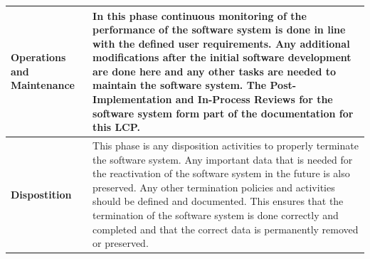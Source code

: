 \begin{xltabular}{\textwidth}{|l|X|}
	\textbf{Operations and Maintenance} & In this phase continuous monitoring of the performance of the software system is done in line with the defined user requirements. Any additional modifications after the initial software development are done here and any other tasks are needed to maintain the software system. The Post-Implementation and In-Process Reviews for the software system form part of the documentation for this LCP. \\ \hline
	\textbf{Dispostition} & This phase is any disposition activities to properly terminate the software system. Any important data that is needed for the reactivation of the software system in the future is also preserved. Any other termination policies and activities should be defined and documented. This ensures that the termination of the software system is done correctly and completed and that the correct data is permanently removed or preserved. \\
\end{xltabular}

